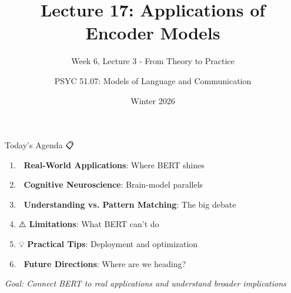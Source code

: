 \documentclass[aspectratio=169]{beamer}
\title{Lecture 17: Applications of Encoder Models}
\subtitle{Week 6, Lecture 3 - From Theory to Practice}
\author{PSYC 51.07: Models of Language and Communication}
\date{Winter 2026}
\begin{document}
\begin{frame}[shrink=10]
\titlepage
\end{frame}

\begin{frame}[shrink=10]{Today's Agenda 📋}
\large
\begin{enumerate}\setlength{\itemsep}{0pt}
    \item 🚀 \textbf{Real-World Applications}: Where BERT shines
    \item 🧠 \textbf{Cognitive Neuroscience}: Brain-model parallels
    \item 🤔 \textbf{Understanding vs. Pattern Matching}: The big debate
    \item ⚠️ \textbf{Limitations}: What BERT can't do
    \item 💡 \textbf{Practical Tips}: Deployment and optimization
    \item 🔮 \textbf{Future Directions}: Where are we heading?
\end{enumerate}

\vspace{1em}
\textit{Goal: Connect BERT to real applications and understand broader implications}
\end{frame}
\end{document}
